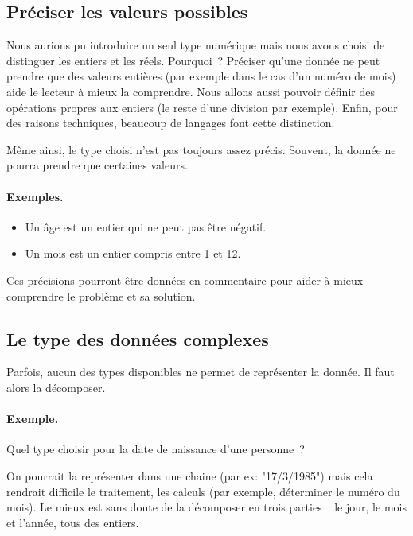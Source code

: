 		\subsection{Préciser les valeurs possibles}
		
			Nous aurions pu introduire un seul type numérique
			mais nous avons choisi de distinguer les entiers et les réels.
			Pourquoi~?
			Préciser qu’une donnée ne peut prendre que des valeurs entières
			(par exemple dans le cas d’un numéro de mois)
			aide le lecteur à mieux la comprendre.
			Nous allons aussi pouvoir définir des opérations propres aux entiers
			(le reste d’une division par exemple).
			Enfin, pour des raisons techniques,
			beaucoup de langages font cette distinction.
			
			Même ainsi, le type choisi n’est pas toujours assez précis.
			Souvent, la donnée ne pourra prendre que certaines valeurs.
			
			\begin{Emphase}
				\paragraph{Exemples.}	
				\begin{itemize} 
				\item Un âge est un entier qui ne peut pas être négatif.
				\item Un mois est un entier compris entre 1 et 12.
				\end{itemize}
			\end{Emphase}
			
			Ces précisions pourront être données en commentaire
			pour aider à mieux comprendre le problème et sa solution.
	
		\subsection{Le type des données complexes}
		
			Parfois, aucun des types disponibles ne permet de représenter 
			la donnée.
			Il faut alors la décomposer.
			
			\begin{Emphase}
				\paragraph{Exemple.}	
				Quel type choisir 
				pour la date de naissance d’une personne~?
				
				On pourrait la représenter dans une chaine 
				(par ex: "17/3/1985")
				mais cela rendrait difficile le traitement, les calculs
				(par exemple, déterminer le numéro du mois).
				Le mieux est sans doute de la décomposer en trois parties~: 
				le jour, le mois et l’année, tous des entiers.
			\end{Emphase}
			
